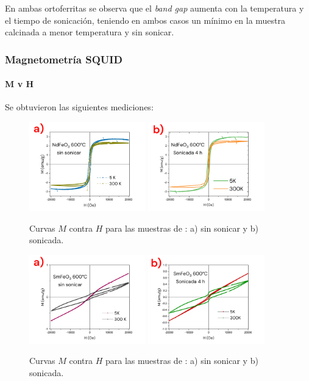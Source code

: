 \documentclass[../main.tex]{subfiles}
\begin{document}
En ambas ortoferritas se observa que el \textit{band gap} aumenta con la temperatura y el tiempo de sonicación, teniendo en ambos casos un mínimo en la muestra calcinada a menor temperatura y sin sonicar.
\subsubsection{Magnetometría SQUID}

\paragraph{M v H}
Se obtuvieron las siguientes mediciones:
\begin{figure}[H]
    \centering
    \includegraphics[width=0.45\textwidth]{fig/mvhNd.png}
    \quad
    \includegraphics[width=0.45\textwidth]{fig/mvhNd-S.png}
    \caption{Curvas $M$ contra $H$ para las muestras de \neod{}: a) sin sonicar y b) sonicada.}
    \label{fig:mvhNd}
\end{figure}
\begin{figure}[H]
    \centering
    \includegraphics[width=0.45\textwidth]{fig/mvhSm.png}
    \quad
    \includegraphics[width=0.45\textwidth]{fig/mvhSm-S.png}
    \caption{Curvas $M$ contra $H$ para las muestras de \sama{}: a) sin sonicar y b) sonicada.}
    \label{fig:mvhSm}
\end{figure}
\end{document}
